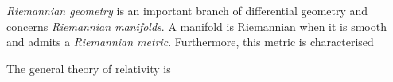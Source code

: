 




\textit{Riemannian geometry} is an important branch of differential geometry and concerns \textit{Riemannian manifolds}. A manifold is Riemannian when it is smooth and admits a \textit{Riemannian metric}. Furthermore, this metric is characterised 



The general theory of relativity is 